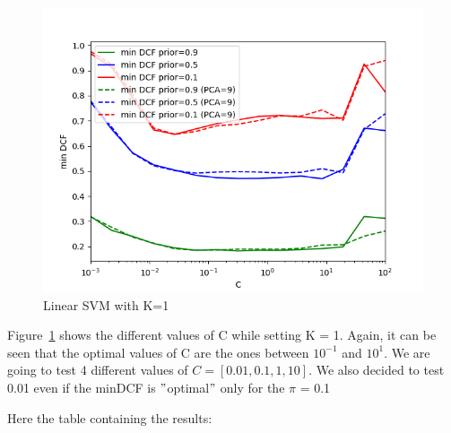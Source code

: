 \documentclass[english]{report}
\begin{document}
\begin{figure}[h!]
    \includegraphics[scale = 0.5]{../../images/validation/SVM_minDCF_comparison_K=1}
    \centering
    \caption{Linear SVM with K=1}
    \label{fig:LinearSVM_K1_valid}
\end{figure}

Figure~\ref{fig:LinearSVM_K1_valid} shows the different values of C while setting K = 1.
Again, it can be seen that the optimal values of C are the ones between $10^{-1}$ and $10^{1}$.
We are going to test 4 different values of \(C = [0.01, 0.1, 1, 10]\).
We also decided to test 0.01 even if the minDCF is \("\)optimal\("\) only for the $\pi$ = 0.1

Here the table containing the results:
\end{document}
